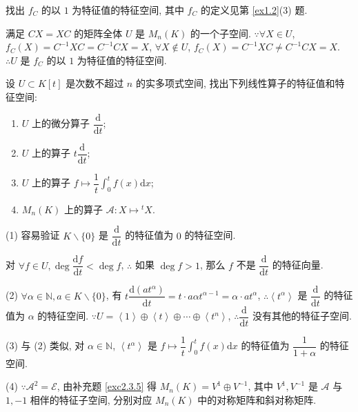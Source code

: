 \documentclass[color=black,device=normal,lang=cn,mode=geye]{elegantnote}
\begin{document}
\begin{exercisec}[2.3.8]
    找出 $f_C$ 的以 $1$ 为特征值的特征空间, 其中 $f_C$ 的定义见第 \ref{ex1.2}(3) 题.
\end{exercisec}
\begin{solution}
    满足 $CX=XC$ 的矩阵全体 $U$ 是 $M_n(K)$ 的一个子空间. $\because\forall X\in U$, $f_C(X)=C^{-1}XC=C^{-1}CX=X$, $\forall X\notin U$, $f_C(X)=C^{-1}XC\neq C^{-1}CX=X$. $\therefore U$ 是 $f_C$ 的以 $1$ 为特征值的特征空间.
\end{solution}
\begin{exercisec}[2.3.10]
    设 $U\subset K[t]$ 是次数不超过 $n$ 的实多项式空间, 找出下列线性算子的特征值和特征空间:
    \begin{enumerate}
        \def\labelenumi{(\arabic{enumi})}
        \item $U$ 上的微分算子 $\dfrac{\mathrm{d}}{\mathrm{d}t}$;
        \item $U$ 上的算子 $t\dfrac{\mathrm{d}}{\mathrm{d}t}$;
        \item $U$ 上的算子 $f\mapsto\dfrac{1}{t}\int_0^tf(x)\mathrm{d}x$;
        \item $M_n(K)$ 上的算子 $\mathcal{A}:X\mapsto{}^tX$.
    \end{enumerate}
\end{exercisec}
\begin{solution}
    (1) 容易验证 $K\backslash\{0\}$ 是 $\dfrac{\mathrm{d}}{\mathrm{d}t}$ 的特征值为 $0$ 的特征空间.
    
    对 $\forall f\in U,\deg\dfrac{\mathrm{d}f}{\mathrm{d}t}<\deg f$, $\therefore$ 如果 $\deg f>1$, 那么 $f$ 不是 $\dfrac{\mathrm{d}}{\mathrm{d}t}$ 的特征向量.

    (2) $\forall\alpha\in\mathbb{N},a\in K\backslash\{0\}$, 有 $t\dfrac{\mathrm{d}(at^\alpha)}{\mathrm{d}t}=t\cdot a\alpha t^{\alpha-1}=\alpha\cdot at^\alpha$, $\therefore\left<t^\alpha\right>$ 是 $\dfrac{\mathrm{d}}{\mathrm{d}t}$ 的特征值为 $\alpha$ 的特征空间. $\because U=\left<1\right>\oplus\left<t\right>\oplus\cdots\oplus\left<t^n\right>$, $\therefore\dfrac{\mathrm{d}}{\mathrm{d}t}$ 没有其他的特征子空间.

    (3) 与 (2) 类似, 对 $\alpha\in\mathbb{N}$, $\left<t^\alpha\right>$ 是 $f\mapsto\dfrac{1}{t}\int_0^tf(x)\mathrm{d}x$ 的特征值为 $\dfrac{1}{1+\alpha}$ 的特征空间.

    (4) $\because\mathcal{A}^2=\mathcal{E}$, 由补充题 \ref{exc2.3.5} 得 $M_n(K)=V^1\oplus V^{-1}$, 其中 $V^1,V^{-1}$ 是 $\mathcal{A}$ 与 $1,-1$ 相伴的特征子空间, 分别对应 $M_n(K)$ 中的对称矩阵和斜对称矩阵.
\end{solution}
\end{document}
